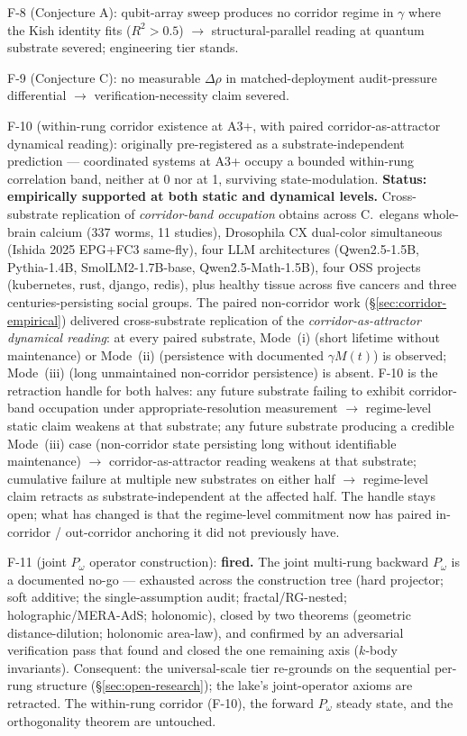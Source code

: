 \documentclass[11pt,a4paper]{article}
\newcommand{\Pomega}{P_{\omega}}
\begin{document}
F-8 (Conjecture A): qubit-array sweep produces no corridor regime in $\gamma$ where the Kish identity fits ($R^2 > 0.5$) $\to$ structural-parallel reading at quantum substrate severed; engineering tier stands.

F-9 (Conjecture C): no measurable $\Delta\rho$ in matched-deployment audit-pressure differential $\to$ verification-necessity claim severed.

F-10 (within-rung corridor existence at A3+, with paired corridor-as-attractor dynamical reading): originally pre-registered as a substrate-independent prediction --- coordinated systems at A3+ occupy a bounded within-rung correlation band, neither at 0 nor at 1, surviving state-modulation. \textbf{Status: empirically supported at both static and dynamical levels.} Cross-substrate replication of \emph{corridor-band occupation} obtains across C.~elegans whole-brain calcium (337 worms, 11 studies), Drosophila CX dual-color simultaneous (Ishida 2025 EPG+FC3 same-fly), four LLM architectures (Qwen2.5-1.5B, Pythia-1.4B, SmolLM2-1.7B-base, Qwen2.5-Math-1.5B), four OSS projects (kubernetes, rust, django, redis), plus healthy tissue across five cancers and three centuries-persisting social groups. The paired non-corridor work (\S\ref{sec:corridor-empirical}) delivered cross-substrate replication of the \emph{corridor-as-attractor dynamical reading}: at every paired substrate, Mode~(i) (short lifetime without maintenance) or Mode~(ii) (persistence with documented $\gamma M(t)$) is observed; Mode~(iii) (long unmaintained non-corridor persistence) is absent. F-10 is the retraction handle for both halves: any future substrate failing to exhibit corridor-band occupation under appropriate-resolution measurement $\to$ regime-level static claim weakens at that substrate; any future substrate producing a credible Mode~(iii) case (non-corridor state persisting long without identifiable maintenance) $\to$ corridor-as-attractor reading weakens at that substrate; cumulative failure at multiple new substrates on either half $\to$ regime-level claim retracts as substrate-independent at the affected half. The handle stays open; what has changed is that the regime-level commitment now has paired in-corridor / out-corridor anchoring it did not previously have.

F-11 (joint $\Pomega$ operator construction): \textbf{fired.} The joint multi-rung backward $\Pomega$ is a documented no-go --- exhausted across the construction tree (hard projector; soft additive; the single-assumption audit; fractal/RG-nested; holographic/MERA-AdS; holonomic), closed by two theorems (geometric distance-dilution; holonomic area-law), and confirmed by an adversarial verification pass that found and closed the one remaining axis ($k$-body invariants). Consequent: the universal-scale tier re-grounds on the sequential per-rung structure (\S\ref{sec:open-research}); the lake's joint-operator axioms are retracted. The within-rung corridor (F-10), the forward $\Pomega$ steady state, and the orthogonality theorem are untouched.
\end{document}
